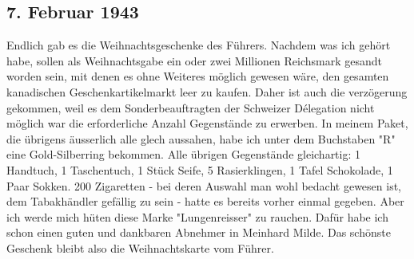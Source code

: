 \subsection{7. Februar 1943}

Endlich gab es die Weihnachtsgeschenke des F\"{u}hrers.
Nachdem was ich geh\"{o}rt habe, sollen als Weihnachtsgabe ein oder zwei Millionen Reichsmark gesandt worden sein, mit denen es ohne Weiteres m\"{o}glich gewesen w\"{a}re, den gesamten kanadischen Geschenkartikelmarkt leer zu kaufen.
Daher ist auch die verz\"{o}gerung gekommen, weil es dem Sonderbeauftragten der Schweizer Délegation nicht m\"{o}glich war die erforderliche Anzahl Gegenst\"{a}nde zu erwerben.
In meinem Paket, die \"{u}brigens \"{a}usserlich alle glech aussahen, habe ich unter dem Buchstaben "R" eine Gold-Silberring bekommen.
Alle \"{u}brigen Gegenst\"{a}nde gleichartig: 1 Handtuch, 1 Taschentuch, 1 St\"{u}ck Seife, 5 Rasierklingen, 1 Tafel Schokolade, 1 Paar Sokken.
200 Zigaretten - bei deren Auswahl man wohl bedacht gewesen ist, dem Tabakh\"{a}ndler gef\"{a}llig zu sein - hatte es bereits vorher einmal gegeben.
Aber ich werde mich h\"{u}ten diese Marke "Lungenreisser" zu rauchen.
Daf\"{u}r habe ich schon einen guten und dankbaren Abnehmer in Meinhard Milde.
Das sch\"{o}nste Geschenk bleibt also die Weihnachtskarte vom F\"{u}hrer.

\clearpage
